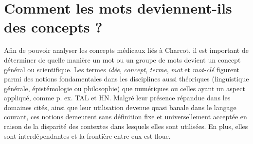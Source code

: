 \section{Comment les mots deviennent-ils des concepts ?}
\label{concept}

Afin de pouvoir analyser les concepts médicaux liés à Charcot, il est important de déterminer de quelle manière un mot ou un groupe de mots devient un concept général ou scientifique. Les termes \textit{idée}, \textit{concept}, \textit{terme}, \textit{mot} et \textit{mot-clé} figurent parmi des notions fondamentales dans les disciplines aussi théoriques (linguistique générale, épistémologie ou philosophie) que numériques ou celles ayant un aspect appliqué, comme p. ex. \textsc{TAL} et \textsc{HN}. 
Malgré leur présence répandue dans les domaines cités, ainsi que leur utilisation devenue quasi banale dans le langage courant, ces notions demeurent sans définition fixe et universellement acceptée en raison de la disparité des contextes dans lesquels elles sont utilisées. En plus, elles sont interdépendantes et la frontière entre eux est floue. 

